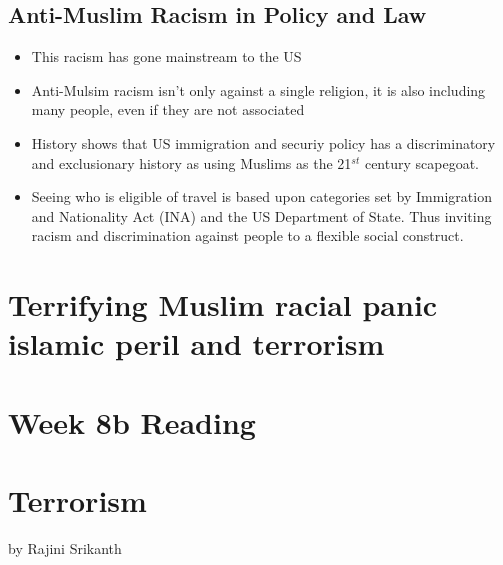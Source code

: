 \documentclass{article}
\begin{document}
  \subsection{Anti-Muslim Racism in Policy and Law}
  \begin{itemize}
    \item This racism has gone mainstream to the US
    \item Anti-Mulsim racism isn't only against a single religion, it is
      also including many people, even if they are not associated
    \item History shows that US immigration and securiy policy
      has a discriminatory and exclusionary history as using
      Muslims as the 21$^{st}$ century scapegoat.
    \item Seeing who is eligible of travel is based upon categories set by
      Immigration and Nationality Act (INA) and the US Department of State.
      Thus inviting racism and discrimination against people to a flexible social
      construct.
  \end{itemize}

  \section{Terrifying Muslim racial panic islamic peril and terrorism}


  \newpage
\section*{Week 8b Reading}

\section{Terrorism}
by Rajini Srikanth
\end{document}

